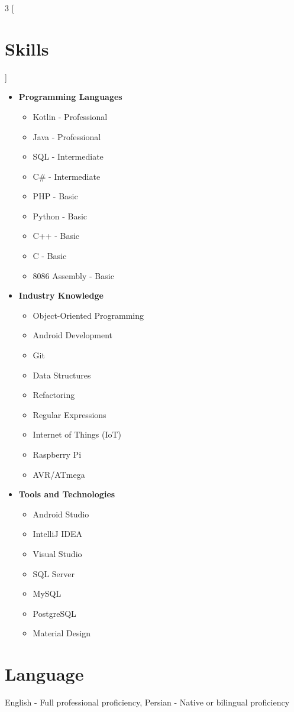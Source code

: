 \begin{multicols}{3}
[\section*{\LARGE{Skills}}]
    \begin{itemize}
        \item \textbf{Programming Languages}
        \begin{itemize}
            \item Kotlin - Professional
            \item Java - Professional
            \item SQL - Intermediate
            \item C\# - Intermediate
            \item PHP - Basic
            \item Python - Basic
            \item C++ - Basic
            \item C - Basic
            \item 8086 Assembly - Basic
        \end{itemize}
        \item \textbf{Industry Knowledge}
        \begin{itemize}
            \item Object-Oriented Programming
            \item Android Development
            \item Git
            \item Data Structures
            \item Refactoring
            \item Regular Expressions
            \item Internet of Things (IoT)
            \item Raspberry Pi
            \item AVR/ATmega
        \end{itemize}
        \item \textbf{Tools and Technologies}
        \begin{itemize}
            \item Android Studio
            \item IntelliJ IDEA
            \item Visual Studio
            \item SQL Server
            \item MySQL
            \item PostgreSQL
            \item Material Design
        \end{itemize}
    \end{itemize}
\end{multicols}

\section*{Language}
English - Full professional proficiency, \qquad\qquad\qquad Persian - Native or bilingual proficiency